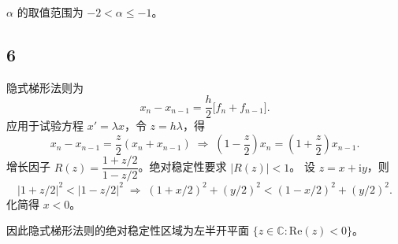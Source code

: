 \documentclass{article}
\begin{document}
\(\alpha\) 的取值范围为 \(-2 < \alpha \le -1\)。


\subsection*{6}

隐式梯形法则为
\[
x_n - x_{n-1} = \frac{h}{2}\bigl[f_n + f_{n-1}\bigr].
\]
应用于试验方程 \(x' = \lambda x\)，令 \(z = h\lambda\)，得
\[
x_n - x_{n-1} = \frac{z}{2}(x_n + x_{n-1})
\;\Longrightarrow\;
\left(1 - \frac{z}{2}\right)x_n = \left(1 + \frac{z}{2}\right)x_{n-1}.
\]
增长因子 \(R(z) = \dfrac{1 + z/2}{1 - z/2}\)。绝对稳定性要求 \(|R(z)| < 1\)。
设 \(z = x + \mathrm{i}y\)，则
\[
|1 + z/2|^2 < |1 - z/2|^2
\;\Longrightarrow\;
(1 + x/2)^2 + (y/2)^2 < (1 - x/2)^2 + (y/2)^2.
\]
化简得 \(x < 0\)。

因此隐式梯形法则的绝对稳定性区域为左半开平面 \(\{z \in \mathbb{C} : \mathrm{Re}(z) < 0\}\)。
\end{document}
